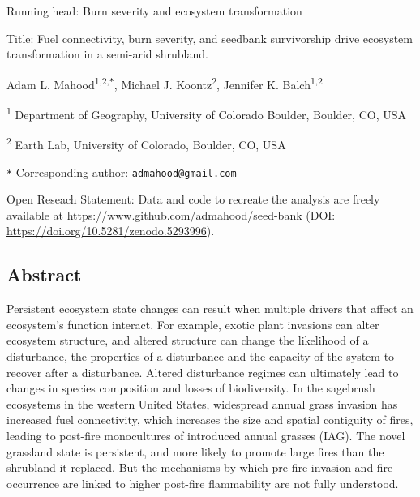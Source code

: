 \documentclass[
  12pt,
]{article}
\author{}
\date{\vspace{-2.5em}}
\begin{document}

Running head: Burn severity and ecosystem transformation

Title: Fuel connectivity, burn severity, and seedbank survivorship drive
ecosystem transformation in a semi-arid shrubland.

Adam L. Mahood\textsuperscript{1,2,\texttt{*}}, Michael J.
Koontz\textsuperscript{2}, Jennifer K. Balch\textsuperscript{1,2}

\small

\textsuperscript{1} Department of Geography, University of Colorado
Boulder, Boulder, CO, USA

\textsuperscript{2} Earth Lab, University of Colorado, Boulder, CO, USA

\texttt{*} Corresponding author:
\href{mailto:admahood@gmail.com}{\nolinkurl{admahood@gmail.com}}

\normalsize

Open Reseach Statement: Data and code to recreate the analysis are
freely available at \url{https://www.github.com/admahood/seed-bank}
(DOI: \url{https://doi.org/10.5281/zenodo.5293996}).

\newpage

\linenumbers

\hypertarget{abstract}{%
\subsection{Abstract}\label{abstract}}

Persistent ecosystem state changes can result when multiple drivers that
affect an ecosystem's function interact. For example, exotic plant
invasions can alter ecosystem structure, and altered structure can
change the likelihood of a disturbance, the properties of a disturbance
and the capacity of the system to recover after a disturbance. Altered
disturbance regimes can ultimately lead to changes in species
composition and losses of biodiversity. In the sagebrush ecosystems in
the western United States, widespread annual grass invasion has
increased fuel connectivity, which increases the size and spatial
contiguity of fires, leading to post-fire monocultures of introduced
annual grasses (IAG). The novel grassland state is persistent, and more
likely to promote large fires than the shrubland it replaced. But the
mechanisms by which pre-fire invasion and fire occurrence are linked to
higher post-fire flammability are not fully understood.
\end{document}
